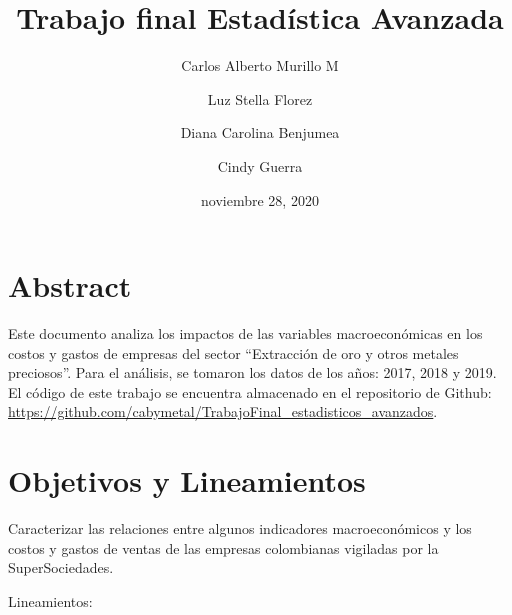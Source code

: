 \documentclass[
  11pt,
  a4paper,
]{book}
\title{Trabajo final Estadística Avanzada}
\author{Carlos Alberto Murillo M \and Luz Stella Florez \and Diana Carolina Benjumea \and Cindy Guerra}
\date{noviembre 28, 2020}
\begin{document}
\frontmatter
\maketitle

{
\setcounter{tocdepth}{2}
\tableofcontents
}
\mainmatter
\hypertarget{abstract}{%
\chapter*{Abstract}\label{abstract}}

Este documento analiza los impactos de las variables macroeconómicas en
los costos y gastos de empresas del sector ``Extracción de oro y otros
metales preciosos''. Para el análisis, se tomaron los datos de los años:
2017, 2018 y 2019. El código de este trabajo se encuentra almacenado en
el repositorio de Github:
\url{https://github.com/cabymetal/TrabajoFinal_estadisticos_avanzados}.

\hypertarget{objetivos-y-lineamientos}{%
\chapter{Objetivos y Lineamientos}\label{objetivos-y-lineamientos}}

Caracterizar las relaciones entre algunos indicadores macroeconómicos y
los costos y gastos de ventas de las empresas colombianas vigiladas por
la SuperSociedades.

Lineamientos:
\end{document}
